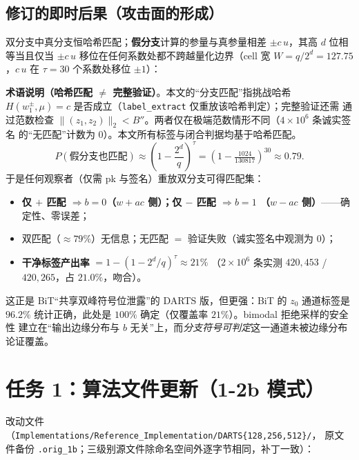 \documentclass[UTF8,11pt,a4paper]{ctexart}
\newcommand{\code}[1]{\texttt{\small #1}}
\begin{document}
\subsection{修订的即时后果（攻击面的形成）}

双分支中真分支恒哈希匹配；\textbf{假分支}计算的参量与真参量相差 $\pm c\,u$，其高
$d$ 位相等当且仅当 $\pm c\,u$ 移位在任何系数处都不跨越量化边界（cell 宽
$W=q/2^d=127.75$，$c\,u$ 在 $\tau=30$ 个系数处移位 $\pm 1$）：

\noindent\textbf{术语说明（哈希匹配 $\neq$ 完整验证）}。本文的``分支匹配''指挑战哈希
$H(w_1^{\pm},\mu)=c$ 是否成立（\code{label\_extract} 仅重放该哈希判定）；完整验证还需
通过范数检查 $\|(z_1,z_2)\|_2<B''$。两者仅在极端范数情形不同（$4\times10^6$ 条诚实签名
的``无匹配''计数为 0）。本文所有标签与闭合判据均基于哈希匹配。
\begin{equation}
P(\text{假分支也匹配})\approx\left(1-\frac{2^d}{q}\right)^{\!\tau}
=\left(1-\tfrac{1024}{130817}\right)^{\!30}\approx 0.79 .
\label{eq:falsematch}
\end{equation}
于是任何观察者（仅需 pk 与签名）重放双分支可得匹配集：
\begin{itemize}
\item \textbf{仅 $+$ 匹配 $\Rightarrow b=0$（$w{+}ac$ 侧）；仅 $-$ 匹配 $\Rightarrow b=1$
      （$w{-}ac$ 侧）}——确定性、零误差；
\item 双匹配（$\approx 79\%$）无信息；无匹配 $=$ 验证失败（诚实签名中观测为 0）；
\item \textbf{干净标签产出率} $=1-(1-2^d/q)^\tau\approx 21\%$
      （$2\times10^6$ 条实测 $420{,}453$ / $420{,}265$，占 $21.0\%$，吻合）。
\end{itemize}
这正是 BiT``共享双峰符号位泄露''的 DARTS 版，但更强：BiT 的 $z_0$ 通道标签是
$96.2\%$ 统计正确，此处是 $100\%$ 确定（仅覆盖率 $21\%$）。bimodal 拒绝采样的安全性
建立在``输出边缘分布与 $b$ 无关''上，而\emph{分支符号可判定}这一通道未被边缘分布
论证覆盖。

\section{任务 1：算法文件更新（1-2b 模式）}

改动文件（\code{Implementations/Reference\_Implementation/DARTS\{128,256,512\}/}，
原文件备份 \code{*.orig\_1b}；三级别源文件除命名空间外逐字节相同，补丁一致）：
\end{document}
